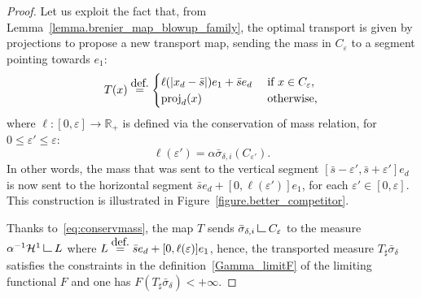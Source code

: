 \documentclass[11pt]{article}
\numberwithin{equation}{section}
\theoremstyle{definition}
\newcommand{\eqdef}{\ensuremath{\stackrel{\mbox{\upshape\tiny def.}}{=}}}
\newcommand\LM[1]{\hbox{\vrule width.5pt \vbox to#1pt{\vfill \hrule width#1pt height.5pt}}}
\newcommand\LL{{\mathchoice {\>\LM7\>}{\>\LM7\>}{\,\LM5\,}{\,\LM{3.35}\,}}}
\newcommand{\mres}{\LL}
\newcommand\cH{\mathcal{H}}
\newcommand{\RR}{\mathbb{R}}
\DeclareMathOperator{\proj}{proj}
\begin{document}
\begin{proof}
Let us exploit the fact that, from Lemma~\ref{lemma.brenier_map_blowup_family}, the optimal transport is given by projections to propose a new transport map, sending the mass in $C_{\varepsilon}$ to a segment pointing towards $e_1$:
\[
T(x)
\eqdef
\begin{cases}
\ell(|x_d-\bar s|)e_1 + \bar s e_d& \text{ if $x \in C_{\varepsilon}$},\\
\proj_d(x)& \text{ otherwise,}
\end{cases}
\]
where $\ell:[0,\varepsilon] \to \RR_+$ is defined via the conservation of mass relation, for $0\le \varepsilon'\le \varepsilon$:
\begin{equation}\label{eq:conservmass}
\ell(\varepsilon') = \alpha \bar \sigma_{\delta, i}(C_{\varepsilon'}).
\end{equation}
In other words, the mass that was sent to the vertical segment $[\bar s-\varepsilon', \bar s+\varepsilon']e_d$ is now sent to the horizontal segment $\bar s e_d+[0, \ell(\varepsilon')]e_1$,
for each $\varepsilon'\in [0,\varepsilon]$.
This construction is illustrated in Figure~\ref{figure.better_competitor}.

Thanks to~\eqref{eq:conservmass}, the map $T$ sends $\bar \sigma_{\delta, i}\mres C_\varepsilon$ to
the measure $\alpha^{-1}\cH^1\mres L$
where $L\eqdef \bar s e_d+[0,\ell(\varepsilon)]e_1$,
hence, the transported measure $T_\sharp \bar \sigma_{\delta}$ satisfies the constraints in the definition~\eqref{Gamma_limitF} of the limiting functional $F$ and one has $F(T_\sharp \bar \sigma_{\delta})<+\infty$.


\end{proof}
\end{document}
